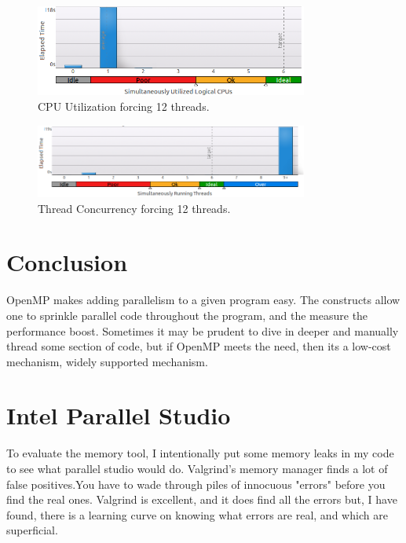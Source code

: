 \documentclass[journal,10pt,onecolumn]{IEEEtran}
\begin{document}
\begin{figure}[!t]
\begin{center}
\includegraphics[width=0.8\textwidth]{figures/12_threaded_matrix_thread_cpu_usage_histogram.png}
\caption{CPU Utilization forcing 12 threads.}
\label{fig:12_threaded_matrix_cpu_usage}
\end{center}
\end{figure}

\begin{figure}[!t]
\begin{center}
\includegraphics[width=0.8\textwidth]{figures/12_threaded_matrix_thread_concurrent_histogram.png}
\caption{Thread Concurrency forcing 12 threads.}
\label{fig:12_threaded_matrix_concurrent}
\end{center}
\end{figure}


\section{Conclusion}
OpenMP makes adding parallelism to a given program easy. The constructs allow one to sprinkle
parallel code throughout the program, and the measure the performance boost. Sometimes it
may be prudent to dive in deeper and manually thread some section of code, but if OpenMP
meets the need, then its a low-cost mechanism, widely supported mechanism.



\appendices
\section{Intel Parallel Studio}
To evaluate the memory tool, I intentionally put some memory leaks in my code 
to see what parallel studio would do.  Valgrind's memory manager finds a lot of 
false positives.You have to wade through piles of innocuous "errors" before you 
find the real ones. Valgrind is excellent, and it does find all the errors but, 
I have found, there is a learning curve on knowing what errors are real, and 
which are superficial. 
\end{document}
